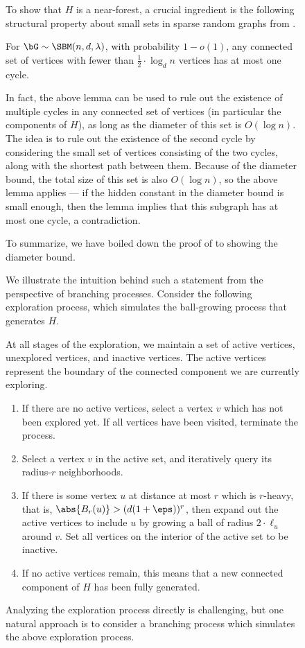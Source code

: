 \documentclass[11pt,letterpaper]{article}
\begin{document}
\begin{figure}
To show that $H$ is a near-forest, a crucial ingredient is the following  structural property about small sets in sparse random graphs from \cite[Lemma 30]{BLM15}.
\begin{displayquote}
    For $\bG \sim \SBM(n,d,\lambda)$, with probability $1-o(1)$, any connected set of vertices with fewer than $\frac{1}{2} \cdot \log_d n$ vertices has at most one cycle.
\end{displayquote}
In fact, the above lemma can be used to rule out the existence of multiple cycles in any connected set of vertices (in particular the components of $H$), as long as the diameter of this set is $O(\log n)$.
The idea is to rule out the existence of the second cycle by considering the small set of vertices consisting of the two cycles, along with the shortest path between them. 
Because of the diameter bound, the total size of this set is also $O(\log n)$, so the above lemma applies --- if the hidden constant in the diameter bound is small enough, then the lemma implies that this subgraph has at most one cycle, a contradiction.

To summarize, we have boiled down the proof of  to showing the diameter bound. 

We illustrate the intuition behind such a statement from the perspective of branching processes.
Consider the following exploration process, which simulates the ball-growing process that generates $H$.

At all stages of the exploration, we maintain a set of active vertices, unexplored vertices, and inactive vertices.
The active vertices represent the boundary of the connected component we are currently exploring.
\begin{enumerate}
    \item If there are no active vertices, select a vertex $v$ which has not been explored yet. If all vertices have been visited, terminate the process. 
    \item Select a vertex $v$ in the active set, and iteratively query its radius-$r$ neighborhoods. 
    \item If there is some vertex $u$ at distance at most $r$ which is $r$-heavy, that is, $\abs{B_{r}(u)} > (d(1+\eps))^r$, then expand out the active vertices to include $u$ by growing a ball of radius $2 \cdot \ell_u$ around $v$. Set all vertices on the interior of the active set to be inactive.
    \item If no active vertices remain, this means that a new connected component of $H$ has been fully generated. 
\end{enumerate}
Analyzing the exploration process directly is challenging, but one natural approach is to consider a branching process which simulates the above exploration process. 


\end{figure}
\end{document}
